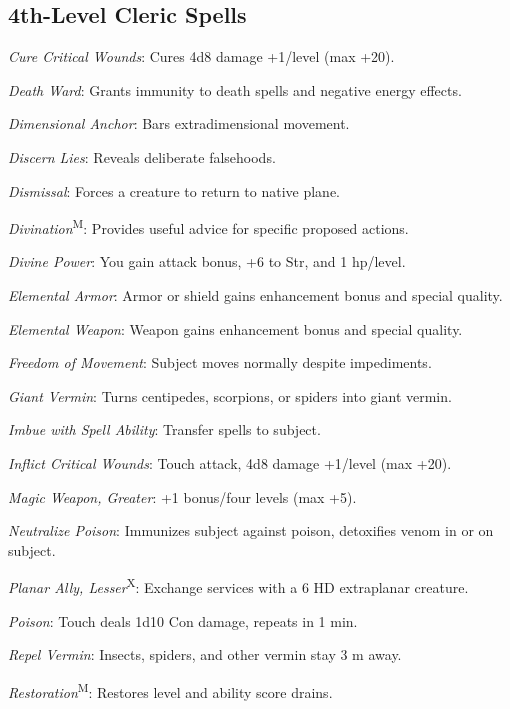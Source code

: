 \subsection{4th-Level Cleric Spells}



\textit{Cure Critical Wounds}: Cures 4d8 damage +1/level (max +20).

\textit{Death Ward}: Grants immunity to death spells and negative energy effects.

\textit{Dimensional Anchor}: Bars extradimensional movement.

\textit{Discern Lies}: Reveals deliberate falsehoods.

\textit{Dismissal}: Forces a creature to return to native plane.

\textit{Divination}\textsuperscript{M}: Provides useful advice for specific proposed actions.

\textit{Divine Power}: You gain attack bonus, +6 to Str, and 1 hp/level.

\textit{Elemental Armor}: Armor or shield gains enhancement bonus and special quality.

\textit{Elemental Weapon}: Weapon gains enhancement bonus and special quality.

\textit{Freedom of Movement}: Subject moves normally despite impediments.

\textit{Giant Vermin}: Turns centipedes, scorpions, or spiders into giant vermin.

\textit{Imbue with Spell Ability}: Transfer spells to subject.

\textit{Inflict Critical Wounds}: Touch attack, 4d8 damage +1/level (max +20).

\textit{Magic Weapon, Greater}: +1 bonus/four levels (max +5).

\textit{Neutralize Poison}: Immunizes subject against poison, detoxifies venom in or on subject.

\textit{Planar Ally, Lesser}\textsuperscript{X}: Exchange services with a 6 HD extraplanar creature.

\textit{Poison}: Touch deals 1d10 Con damage, repeats in 1 min.

\textit{Repel Vermin}: Insects, spiders, and other vermin stay 3 m away.

\textit{Restoration}\textsuperscript{M}: Restores level and ability score drains.

